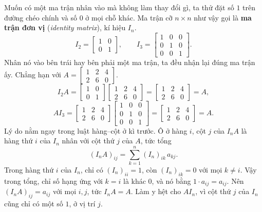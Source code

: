 \documentclass[12pt,a4paper]{article}
\begin{document}
Muốn có một ma trận nhân vào mà không làm thay đổi gì, ta thử đặt số \(1\) trên đường chéo chính và số \(0\) ở mọi chỗ khác. Ma trận cỡ \(n\times n\) như vậy gọi là \textbf{ma trận đơn vị} (\emph{identity matrix}), kí hiệu \(I_n\).
$$
I_2=\left[ \begin{array}{cc} 1 & 0\\ 0 & 1 \end{array} \right],\qquad
I_3=\left[ \begin{array}{rrr} 1 & 0 & 0\\ 0 & 1 & 0\\ 0 & 0 & 1 \end{array} \right].
$$
Nhân nó vào bên trái hay bên phải một ma trận, ta đều nhận lại đúng ma trận ấy. Chẳng hạn với \(A=\left[ \begin{array}{rrr} 1 & 2 & 4\\ 2 & 6 & 0 \end{array} \right]\).
$$
I_2A=\left[ \begin{array}{rr} 1 & 0\\ 0 & 1 \end{array} \right]\left[ \begin{array}{rrr} 1 & 2 & 4\\ 2 & 6 & 0 \end{array} \right]=\left[ \begin{array}{rrr} 1 & 2 & 4\\ 2 & 6 & 0 \end{array} \right]=A,
$$
$$
AI_3=\left[ \begin{array}{rrr} 1 & 2 & 4\\ 2 & 6 & 0 \end{array} \right]\left[ \begin{array}{rrr} 1 & 0 & 0\\ 0 & 1 & 0\\ 0 & 0 & 1 \end{array} \right]=\left[ \begin{array}{rrr} 1 & 2 & 4\\ 2 & 6 & 0 \end{array} \right]=A.
$$
Lý do nằm ngay trong luật hàng--cột ở kì trước. Ô ở hàng \(i\), cột \(j\) của \(I_nA\) là hàng thứ \(i\) của \(I_n\) nhân với cột thứ \(j\) của \(A\), tức tổng
$$
(I_nA)_{ij}=\sum_{k=1}^{n}(I_n)_{ik}\,a_{kj}.
$$
Trong hàng thứ \(i\) của \(I_n\), chỉ có \((I_n)_{ii}=1\), còn \((I_n)_{ik}=0\) với mọi \(k\neq i\). Vậy trong tổng, chỉ số hạng ứng với \(k=i\) là khác \(0\), và nó bằng \(1\cdot a_{ij}=a_{ij}\). Nên \((I_nA)_{ij}=a_{ij}\) với mọi \(i,j\), tức \(I_nA=A\). Làm y hệt cho \(AI_n\), vì cột thứ \(j\) của \(I_n\) cũng chỉ có một số \(1\), ở vị trí \(j\).
\end{document}
